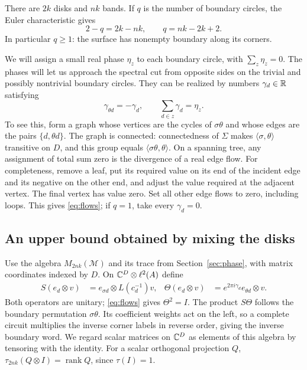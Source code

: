 There are $2k$ disks and $nk$ bands. If $q$ is the number of boundary
circles, the Euler characteristic gives
\begin{equation}\label{eq:euler}
 2-q=2k-nk,\qquad q=nk-2k+2.
\end{equation}
In particular $q\geq1$: the surface has nonempty boundary along its corners.

We will assign a small real phase $\eta_z$ to each boundary circle, with
$\sum_z\eta_z=0$. The phases will let us approach the spectral cut from
opposite sides on the trivial and possibly nontrivial boundary circles.
They can be realized by numbers $\gamma_d\in\mathbb R$
satisfying
\begin{equation}\label{eq:flows}
 \gamma_{\theta d}=-\gamma_d,\qquad
 \sum_{d\in z}\gamma_d=\eta_z.
\end{equation}
To see this, form a graph whose vertices are the cycles of $\sigma\theta$
and whose edges are the pairs $\{d,\theta d\}$. The graph is connected:
connectedness of $\Sigma$ makes $\langle\sigma,\theta\rangle$ transitive on
$D$, and this group equals $\langle\sigma\theta,\theta\rangle$.
On a spanning tree, any assignment of total sum zero is the divergence of
a real edge flow. For completeness, remove a leaf, put its required value
on its end of the incident edge and its negative on the other end, and
adjust the value required at the adjacent vertex. The final vertex has
value zero. Set all other edge flows to zero, including loops. This gives
\eqref{eq:flows}; if $q=1$, take every $\gamma_d=0$.

\subsection{An upper bound obtained by mixing the disks}

Use the algebra $M_{2nk}(\mathcal M)$ and its trace from
Section~\ref{sec:phase}, with matrix coordinates indexed by $D$.
On $\mathbb C^D\otimes\ell^2(A)$ define
\begin{align}\label{eq:shifts}
 S(e_d\otimes v)&=e_{\sigma d}\otimes L(c_d^{-1})v, &
 \Theta(e_d\otimes v)&=e^{2\pi i\gamma_d}e_{\theta d}\otimes v.
\end{align}
Both operators are unitary; \eqref{eq:flows} gives $\Theta^2=I$.
The product $S\Theta$ follows the boundary permutation $\sigma\theta$.
Its coefficient weights act on the left, so a complete circuit multiplies
the inverse corner labels in reverse order, giving the inverse boundary word.
We regard scalar matrices on $\mathbb C^D$ as elements of this algebra by tensoring
with the identity. For a scalar orthogonal projection $Q$,
$\tau_{2nk}(Q\otimes I)=\operatorname{rank}Q$, since $\tau(I)=1$.


